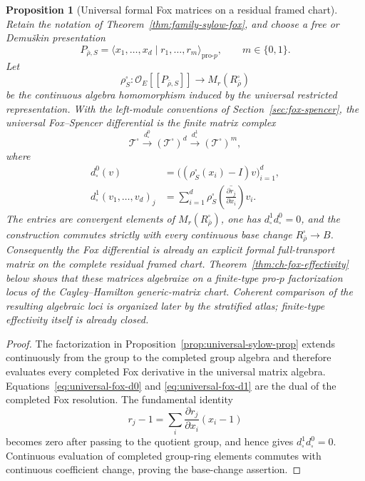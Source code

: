 \documentclass[11pt]{article}
\newtheorem{proposition}[theorem]{Proposition}
\theoremstyle{definition}
\begin{document}
\begin{proposition}[Universal formal Fox matrices on a residual framed chart]\label{prop:universal-formal-fox-matrices}
Retain the notation of Theorem~\ref{thm:family-sylow-fox}, and choose a free or Demu\v{s}kin presentation
\[
 P_{\bar\rho,S}
 =\langle x_1,\ldots,x_d\mid r_1,\ldots,r_m\rangle_{\mathrm{pro}\text{-}p},
 \qquad m\in\{0,1\}.
\]
Let
\[
 \rho_S^{\square}:\mathcal O_E[[P_{\bar\rho,S}]]
 \longrightarrow
 M_r(R_{\bar\rho}^{\square})
\]
be the continuous algebra homomorphism induced by the universal restricted representation.  With the left-module conventions of Section~\ref{sec:fox-spencer}, the universal Fox--Spencer differential is the finite matrix complex
\begin{equation}\label{eq:universal-formal-fox-complex}
 \mathcal T^{\square}
 \xrightarrow{\ d^0_{\square}\ }
 (\mathcal T^{\square})^d
 \xrightarrow{\ d^1_{\square}\ }
 (\mathcal T^{\square})^m,
\end{equation}
where
\begin{align}
 d^0_{\square}(v)
 &=\bigl((\rho_S^{\square}(x_i)-I)v\bigr)_{i=1}^d,\label{eq:universal-fox-d0}\\
 d^1_{\square}(v_1,\ldots,v_d)_j
 &=\sum_{i=1}^d
 \rho_S^{\square}\!\left(
 \overline{\frac{\partial r_j}{\partial x_i}}
 \right)v_i.\label{eq:universal-fox-d1}
\end{align}
The entries are convergent elements of
$M_r(R_{\bar\rho}^{\square})$, one has
$d^1_{\square}d^0_{\square}=0$, and the construction commutes strictly with every continuous base change
$R_{\bar\rho}^{\square}\to B$.
Consequently the Fox differential is already an explicit formal full-transport matrix on the complete residual framed chart.  Theorem~\ref{thm:ch-fox-effectivity} below shows that these matrices algebraize on a finite-type pro-$p$ factorization locus of the Cayley--Hamilton generic-matrix chart.  Coherent comparison of the resulting algebraic loci is organized later by the stratified atlas; finite-type effectivity itself is already closed.
\end{proposition}

\begin{proof}
The factorization in Proposition~\ref{prop:universal-sylow-prop} extends continuously from the group to the completed group algebra and therefore evaluates every completed Fox derivative in the universal matrix algebra.  Equations~\eqref{eq:universal-fox-d0} and \eqref{eq:universal-fox-d1} are the dual of the completed Fox resolution.  The fundamental identity
\[
 r_j-1
 =\sum_i
 \frac{\partial r_j}{\partial x_i}(x_i-1)
\]
becomes zero after passing to the quotient group, and hence gives
$d^1_{\square}d^0_{\square}=0$.  Continuous evaluation of completed group-ring elements commutes with continuous coefficient change, proving the base-change assertion.
\end{proof}
\end{document}
